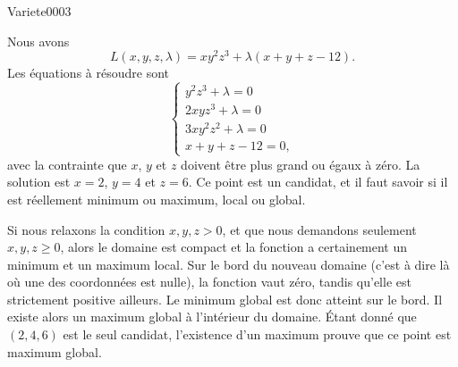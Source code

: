 
\begin{corrige}{Variete0003}

	Nous avons
	\begin{equation}
		L(x,y,z,\lambda)=xy^2z^3+\lambda(x+y+z-12).
	\end{equation}
	Les équations à résoudre sont
	\begin{equation}
		\left\{
		\begin{array}{ll}
			y^2z^3+\lambda=0\\
			2xyz^3+\lambda=0\\
			3xy^2z^2+\lambda=0\\
			x+y+z-12=0,
		\end{array}
		\right.
	\end{equation}
	avec la contrainte que $x$, $y$ et $z$ doivent être plus grand ou égaux à zéro. La solution est $x=2$, $y=4$ et $z=6$. Ce point est un candidat, et il faut savoir si il est réellement minimum ou maximum, local ou global.

	Si nous relaxons la condition $x,y,z>0$, et que nous demandons seulement $x,y,z\geq 0$, alors le domaine est compact et la fonction a certainement un minimum et un maximum local. Sur le bord du nouveau domaine (c'est à dire là où une des coordonnées est nulle), la fonction vaut zéro, tandis qu'elle est strictement positive ailleurs. Le minimum global est donc atteint sur le bord. Il existe alors un maximum global à l'intérieur du domaine. Étant donné que $(2,4,6)$ est le seul candidat, l'existence d'un maximum prouve que ce point est maximum global.

\end{corrige}
